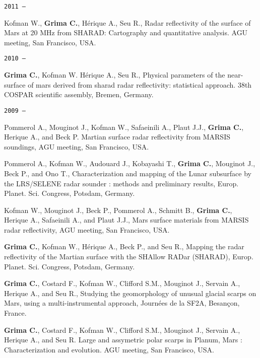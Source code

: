 \begin{etaremune}
\hspace{-2em}\texttt{2011 ---}

\item
  Kofman W., \textbf{Grima C.}, Hérique A., Seu R., Radar reflectivity
  of the surface of Mars at 20 MHz from SHARAD: Cartography and
  quantitative analysis. AGU meeting, San Francisco, USA.

\hspace{-2em}\texttt{2010 ---}

\item
  \textbf{Grima C.}, Kofman W. Hérique A., Seu R., Physical parameters
  of the near-surface of mars derived from sharad radar reflectivity:
  statistical approach. 38th COSPAR scientific assembly, Bremen,
  Germany.

\hspace{-2em}\texttt{2009 ---}

\item
  Pommerol A., Mouginot J., Kofman W., Safaeinili A., Plaut J.J.,
  \textbf{Grima C.}, Herique A., and Beck P. Martian surface radar
  reflectivity from MARSIS soundings, AGU meeting, San Francisco, USA.
\item
  Pommerol A., Kofman W., Audouard J., Kobayashi T., \textbf{Grima C.},
  Mouginot J., Beck P., and Ono T., Characterization and mapping of the
  Lunar subsurface by the LRS/SELENE radar sounder : methods and
  preliminary results, Europ. Planet. Sci. Congress, Potsdam, Germany.
\item
  Kofman W., Mouginot J., Beck P., Pommerol A., Schmitt B.,
  \textbf{Grima C.}, Herique A., Safaeinili A., and Plaut J.J., Mars
  surface materials from MARSIS radar reflectivity, AGU meeting, San
  Francisco, USA.
\item
  \textbf{Grima C.}, Kofman W., Hérique A., Beck P., and Seu R., Mapping
  the radar reflectivity of the Martian surface with the SHAllow RADar
  (SHARAD), Europ. Planet. Sci. Congress, Potsdam, Germany.
\item
  \textbf{Grima C.}, Costard F., Kofman W., Clifford S.M., Mouginot J.,
  Servain A., Herique A., and Seu R., Studying the geomorphology of
  unusual glacial scarps on Mars, using a multi-instrumental approach,
  Journées de la SF2A, Besançon, France.
\item
  \textbf{Grima C.}, Costard F., Kofman W., Clifford S.M., Mouginot J.,
  Servain A., Herique A., and Seu R. Large and assymetric polar scarps
  in Planum, Mars : Characterization and evolution. AGU meeting, San
  Francisco, USA.


\end{etaremune}
